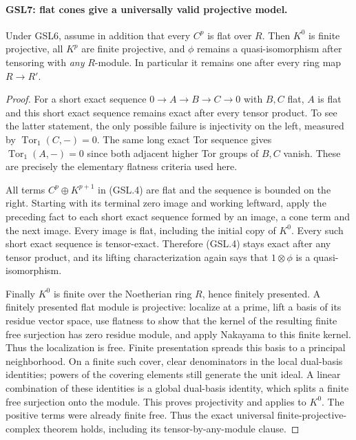 \paragraph{GSL7: flat cones give a universally valid projective model.}
\label{claim:GSL7}
Under GSL6, assume in addition that every $C^p$ is flat over $R$.
Then $K^0$ is finite projective, all $K^p$ are finite projective,
and $\phi$ remains a quasi-isomorphism after tensoring with
\emph{any} $R$-module.  In particular it remains one after every
ring map $R\to R'$.

\begin{proof}
For a short exact sequence $0\to A\to B\to C\to0$ with $B,C$
flat, $A$ is flat and this short exact sequence remains exact after
every tensor product.  To see the latter statement, the only possible
failure is injectivity on the left, measured by
$\operatorname{Tor}_1(C,-)=0$.  The same long exact Tor sequence
gives $\operatorname{Tor}_1(A,-)=0$ since both adjacent higher Tor
groups of $B,C$ vanish.  These are precisely the elementary flatness
criteria used here.

All terms $C^p\oplus K^{p+1}$ in (GSL.4) are flat and the sequence
is bounded on the right.  Starting with its terminal zero image and
working leftward, apply the preceding fact to each short exact sequence
formed by an image, a cone term and the next image.  Every image is
flat, including the initial copy of $K^0$.  Every such short exact
sequence is tensor-exact.  Therefore (GSL.4) stays exact after any
tensor product, and its lifting characterization again says that
$1\otimes\phi$ is a quasi-isomorphism.

Finally $K^0$ is finite over the Noetherian ring $R$, hence finitely
presented.  A finitely presented flat module is projective: localize
at a prime, lift a basis of its residue vector space, use flatness to
show that the kernel of the resulting finite free surjection has
zero residue module, and apply Nakayama to this finite kernel.
Thus the localization is free.  Finite presentation spreads this
basis to a principal neighborhood.  On a finite such cover, clear
denominators in the local dual-basis identities; powers of the
covering elements still generate the unit ideal.  A linear
combination of these identities is a global dual-basis identity,
which splits a finite free surjection onto the module.
This proves projectivity and applies to $K^0$.  The positive
terms were already finite free.  Thus the exact universal
finite-projective-complex theorem holds, including its
tensor-by-any-module clause.
\end{proof}

